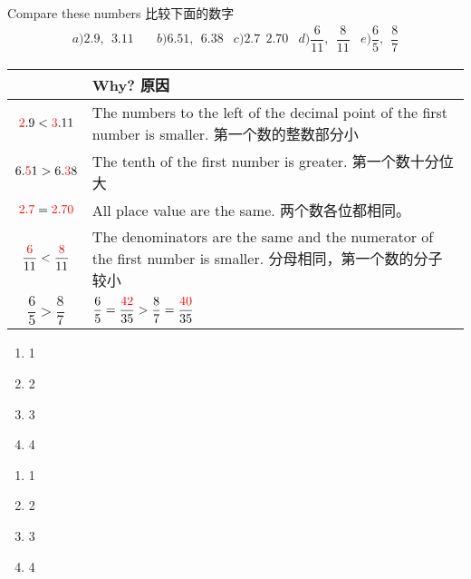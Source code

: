 \begin{example}
Compare these numbers 比较下面的数字
$$
\begin{matrix}
a) 2.9, \ \  3.11\quad & b)  6.51,\ \ 6.38  & c)  2.7\ \ 2.70 & d) \dfrac{6}{11}, \ \ \dfrac{8}{11} & e) \dfrac{6}{5}, \ \ \dfrac{8}{7} 
\end{matrix}
$$
\end{example}
\begin{solution}

{
\centering
\begin{tabular}{|c|p{10cm}|}
\toprule	
& \parbox[c]{10cm}{\centering Why? 原因}\\
\midrule
${\color{red}2}.9 < {\color{red}3}.11$ & The numbers to the left of the decimal point of the first number is smaller. 第一个数的整数部分小\\ \hline
$6.{\color{red}5}1 > 6.{\color{red}3}8$ & The tenth of the first number is greater.  第一个数十分位大\\ \hline
${\color{red}2.7} = {\color{red}2.70}$& All place value are the same.  两个数各位都相同。\\ \hline
$\dfrac{\color{red} 6}{11}<\dfrac{\color{red} 8}{11}$ & The denominators are the same and the numerator of the first number is smaller. 分母相同，第一个数的分子较小\\ \hline
$\dfrac{6}{5} > \dfrac{8}{7}$ & $\dfrac{6}{5} = \dfrac{\color{red} 42}{35} > \dfrac{8}{7} = \dfrac{\color{red} 40}{35}$ \\ 
\bottomrule
\end{tabular}
}

\end{solution}

\begin{exercise}
\begin{paracol}{2}
\begin{enumerate}
\item 1
\item 2
\item 3
\item 4
\end{enumerate}
\switchcolumn[1]
\begin{enumerate}
\item 1
\item 2
\item 3
\item 4
\end{enumerate}
\end{paracol}
\end{exercise}
   \newpage